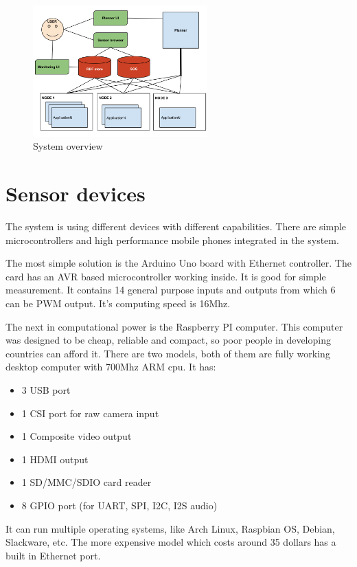 \begin{figure}[h]
	\centering
	\includegraphics[width=0.6\textwidth]{figures/sysarch.png}
	\caption{System overview\label{fig:sysover}}
\end{figure}

\section{Sensor devices}
The system is using different devices with different capabilities. There are simple microcontrollers and high performance mobile phones integrated in the system. 

The most simple solution is the Arduino Uno board with Ethernet controller. The card has an AVR based microcontroller working inside. It is good for simple measurement. It contains 14 general purpose inputs and outputs from which 6 can be PWM output. It's computing speed is 16Mhz.

The next in computational power is the Raspberry PI computer. This computer was designed to be cheap, reliable and compact, so poor people in developing countries can afford it. There are two models, both of them are fully working desktop computer with 700Mhz ARM cpu. It has:
\begin{itemize}
	\item 3 USB port
	\item 1 CSI port for raw camera input
	\item 1 Composite video output
	\item 1 HDMI output
	\item 1 SD/MMC/SDIO card reader
	\item 8 GPIO port (for UART, SPI, I2C, I2S audio)
\end{itemize} 
 It can run multiple operating systems, like Arch Linux, Raspbian OS, Debian, Slackware, etc. The more expensive model which costs around 35 dollars has a built in Ethernet port.  

